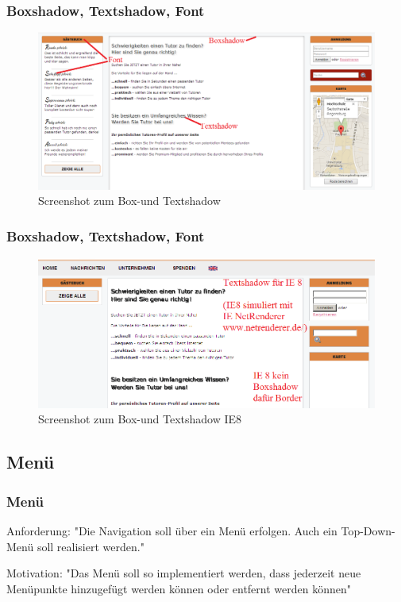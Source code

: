 \begin{frame}

\frametitle{Boxshadow, Textshadow, Font}
\begin{figure}[!htbp]
 \centering
\includegraphics[width=0.9\linewidth]{./Source/boxshadow.png}
 \caption{Screenshot zum Box-und Textshadow}

\end{figure}

\end{frame}

\begin{frame}

\frametitle{Boxshadow, Textshadow, Font}
\begin{figure}[!htbp]
 \centering
\includegraphics[width=0.9\linewidth]{./Source/IE8textshadow.png}
 \caption{Screenshot zum Box-und Textshadow IE8}

\end{figure}

\end{frame}



\subsection{Menü}

\begin{frame} %
  \frametitle{Menü} %


  \begin{block}{Anforderung:}
	"Die Navigation soll über ein Menü erfolgen. Auch ein Top-Down-Menü soll realisiert werden."
  \end{block}

  \begin{block}{Motivation:}
	"Das Menü soll so implementiert werden, dass jederzeit neue Menüpunkte hinzugefügt werden können oder entfernt werden können"
  \end{block}
\end{frame}


